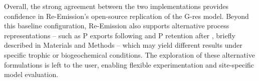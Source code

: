 \documentclass[10pt]{article}
\begin{document}
Overall, the strong agreement between the two implementations provides confidence in Re-Emission's open-source replication of the G-res model.
Beyond this baseline configuration, Re-Emission also supports alternative process representations -- such as P exports following \citet{McDowell2020} and P retention after \citet{Maavara2015}, briefly described in Materials and Methods -- which may yield different results under specific trophic or biogeochemical conditions.
The exploration of these alternative formulations is left to the user, enabling flexible experimentation and site-specific model evaluation.

%
%
%
%
\end{document}
